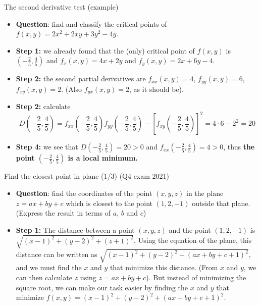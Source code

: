 \begin{frame}{The second derivative test (example)}
    \begin{itemize}
        \item\textbf{Question}: find and classify the critical points of $f(x,y)=2x^2+2xy+3y^2-4y$.
        \item\pause\textbf{Step 1:} we already found that the (only) critical point of $f(x,y)$ is $\left(-\frac{2}{5},\frac{4}{5}\right)$ and $f_x(x,y)=4x+2y$ and $f_y(x,y)=2x+6y-4$.
        \item\pause\textbf{Step 2:} the second partial derivatives are $f_{xx}(x,y)=4$, $f_{yy}(x,y)=6$, $f_{xy}(x,y)=2$. {\footnotesize(Also $f_{yx}(x,y)=2$, as it should be).}
        \item\pause\textbf{Step 2:} calculate {\footnotesize\[D\left(-\frac{2}{5},\frac{4}{5}\right)=f_{xx}\left(-\frac{2}{5},\frac{4}{5}\right)f_{yy}\left(-\frac{2}{5},\frac{4}{5}\right)-\left[f_{xy}\left(-\frac{2}{5},\frac{4}{5}\right)\right]^2=4\cdot6-2^2=20\]}
        \item\pause\textbf{Step 4:} we see that $D(-\frac{2}{5},\frac{4}{5})=20>0$ and $f_{xx}(-\frac{2}{5},\frac{4}{5})=4>0$, thus \textbf{the point $(-\frac{2}{5},\frac{4}{5})$ is a local minimum.}

    \end{itemize}


\end{frame}

\begin{frame}{Find the closest point in plane (1/3) (Q4 exam 2021)}
    \begin{itemize}
        \item\textbf{Question}: find the coordinates of the point $(x,y,z)$ in the plane $z=ax+by+c$ which is closest to the point $(1,2,-1)$ outside that plane. (Express the result in terms of $a$, $b$ and $c$)
        \item\pause\textbf{Step 1:}
            The distance between a point $(x,y,z)$ and the point $(1,2,-1)$ is $\sqrt{(x-1)^2+(y-2)^2+(z+1)^2}$. Using the equation of the plane, this distance can be written as $\sqrt{(x-1)^2+(y-2)^2+(ax+by+c+1)^2}$, and we must find the $x$ and $y$ that minimize this distance. (From $x$ and $y$, we can then calculate $z$ using $z=ax+by+c$). But instead of minimizing the square root, we can make our task easier by finding the $x$ and $y$ that minimize $f(x,y)=(x-1)^2+(y-2)^2+(ax+by+c+1)^2$.

    \end{itemize}

\end{frame}

